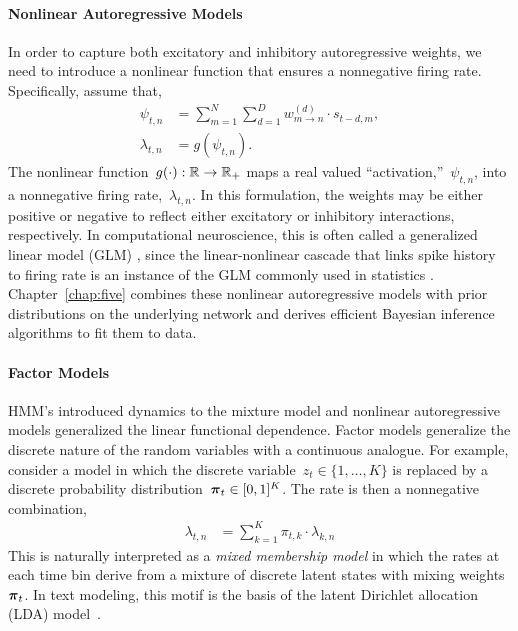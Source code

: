 \paragraph{Nonlinear Autoregressive Models}
In order to capture both excitatory and inhibitory autoregressive weights,
we need to introduce a nonlinear function that ensures a nonnegative firing 
rate. Specifically, assume that,
\begin{align*}
  \psi_{t,n} &= \sum_{m=1}^N \sum_{d=1}^D w_{m \to n}^{(d)} \cdot s_{t-d,m}, \\
  \lambda_{t,n} &= g \left( \psi_{t,n} \right).
\end{align*}
The nonlinear function~${g(\cdot): \mathbb{R} \to \mathbb{R}_+}$ maps a real
valued ``activation,''~$\psi_{t,n}$, into a nonnegative firing
rate,~$\lambda_{t,n}$. 
In this formulation, the weights may be either
positive or negative to reflect either excitatory or inhibitory
interactions, respectively.  In computational neuroscience, this is
often called a generalized linear model (GLM) \citep{Paninski-2004,
  Truccolo-2005, Pillow-2008}, since the linear-nonlinear cascade
that links spike history to firing rate is an instance of the
GLM commonly used in statistics \citep{nelder1972generalized}.
Chapter~\ref{chap:five} combines these nonlinear autoregressive models
with prior distributions on the underlying network and derives
efficient Bayesian inference algorithms to fit them to data.

\paragraph{Factor Models}
HMM's introduced dynamics to the mixture model and nonlinear
autoregressive models generalized the linear functional dependence.
Factor models generalize the discrete nature of the random variables
with a continuous analogue. For example, consider a model in which the
discrete variable~${z_t \in \{1, \ldots, K\}}$ is replaced by a
discrete probability distribution~${\boldsymbol{\pi}_t \in [0,1]^K}$. The rate
is then a nonnegative combination,
\begin{align*}
  \lambda_{t,n} &= \sum_{k=1}^K \pi_{t,k} \cdot \lambda_{k,n}
\end{align*}
This is naturally interpreted as a \emph{mixed membership model} in
which the rates at each time bin derive from a mixture of discrete
latent states with mixing weights~$\boldsymbol{\pi}_t$. In text modeling, this motif
is the basis of the latent Dirichlet allocation (LDA)
model~\citep{blei2003latent}.

